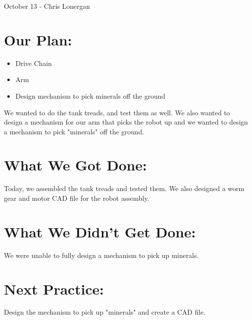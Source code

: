 \documentclass[12pt]{article}
\begin{document}
October 13 - Chris Lonergan

\section{Our Plan:}
\begin{itemize}
	\item Drive Chain
	\item Arm
	\item Design mechanism to pick minerals off the ground
\end{itemize}

We wanted to do the tank treads, and test them as well. We also wanted to design a mechanism for our arm that picks the robot up and we wanted to design a mechanism to pick "minerals" off the ground.

\section{What We Got Done:}

Today, we assembled the tank treads and tested them. We also designed a worm gear and motor CAD file for the robot assembly.


\section{What We Didn't Get Done:}

We were unable to fully design a mechanism to pick up minerals.

\section{Next Practice:}
Design the mechanism to pick up "minerals" and create a CAD file.
\end{document}
